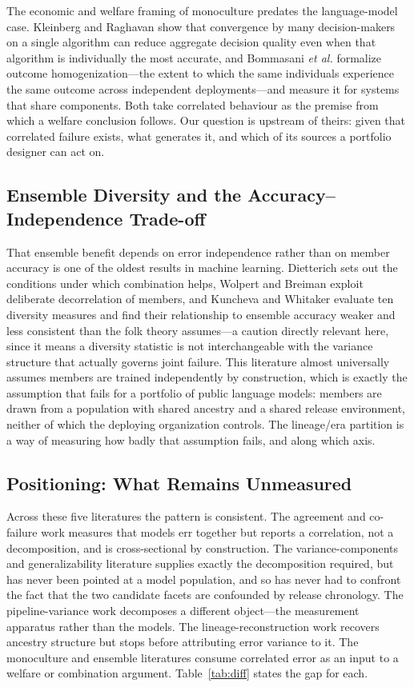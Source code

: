 \documentclass{ieeeaccess}
\theoremstyle{definition}
\theoremstyle{plain}
\begin{document}
The economic and welfare framing of monoculture predates the language-model
case. Kleinberg and Raghavan \cite{kleinberg2021} show that convergence by many
decision-makers on a single algorithm can reduce aggregate decision quality
even when that algorithm is individually the most accurate, and Bommasani
\emph{et al.} \cite{bommasani2022} formalize outcome homogenization---the
extent to which the same individuals experience the same outcome across
independent deployments---and measure it for systems that share components.
Both take correlated behaviour as the premise from which a welfare conclusion
follows. Our question is upstream of theirs: given that correlated failure
exists, what generates it, and which of its sources a portfolio designer can
act on.

\subsection{Ensemble Diversity and the Accuracy--Independence Trade-off}
That ensemble benefit depends on error independence rather than on member
accuracy is one of the oldest results in machine learning. Dietterich
\cite{dietterich2000} sets out the conditions under which combination helps,
Wolpert \cite{wolpert1992} and Breiman \cite{breiman2001} exploit deliberate
decorrelation of members, and Kuncheva and Whitaker \cite{kuncheva2003}
evaluate ten diversity measures and find their relationship to ensemble
accuracy weaker and less consistent than the folk theory assumes---a caution
directly relevant here, since it means a diversity statistic is not
interchangeable with the variance structure that actually governs joint
failure. This literature almost universally assumes members are trained
independently by construction, which is exactly the assumption that fails for
a portfolio of public language models: members are drawn from a population with
shared ancestry and a shared release environment, neither of which the
deploying organization controls. The lineage/era partition is a way of
measuring how badly that assumption fails, and along which axis.

\subsection{Positioning: What Remains Unmeasured}
Across these five literatures the pattern is consistent. The agreement and
co-failure work measures that models err together but reports a correlation,
not a decomposition, and is cross-sectional by construction. The
variance-components and generalizability literature supplies exactly the
decomposition required, but has never been pointed at a model population, and
so has never had to confront the fact that the two candidate facets are
confounded by release chronology. The pipeline-variance work decomposes a
different object---the measurement apparatus rather than the models. The
lineage-reconstruction work recovers ancestry structure but stops before
attributing error variance to it. The monoculture and ensemble literatures
consume correlated error as an input to a welfare or combination argument.
Table~\ref{tab:diff} states the gap for each.
\end{document}
